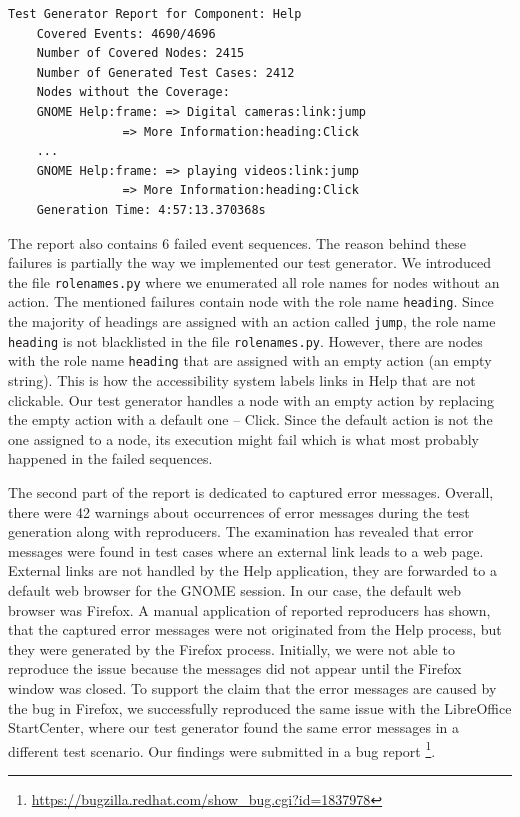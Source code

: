\begin{minipage}\linewidth
\begin{lstlisting}[caption={
Final test generator report for GNOME Help},label={yelp-report}]
    Test Generator Report for Component: Help
    Covered Events: 4690/4696
    Number of Covered Nodes: 2415
    Number of Generated Test Cases: 2412
    Nodes without the Coverage:
    GNOME Help:frame: => Digital cameras:link:jump 
                => More Information:heading:Click
    ...
    GNOME Help:frame: => playing videos:link:jump
                => More Information:heading:Click 
    Generation Time: 4:57:13.370368s
\end{lstlisting}
\end{minipage}

The report also contains 6 failed event sequences. The reason behind these failures is partially the way we implemented our test generator. We introduced the file \texttt{rolenames.py} where we enumerated all role names for nodes without an action. The mentioned failures contain node with the role name \texttt{heading}. Since the majority of headings are assigned with an action called \texttt{jump}, the role name \texttt{heading} is not blacklisted in the file \texttt{rolenames.py}. However, there are nodes with the role name \texttt{heading} that are assigned with an empty action (an empty string). This is how the accessibility system labels links in Help that are not clickable. Our test generator handles a node with an empty action by replacing the empty action with a default one -- Click. Since the default action is not the one assigned to a node, its execution might fail which is what most probably happened in the failed sequences. 

The second part of the report is dedicated to captured error messages. Overall, there were 42 warnings about occurrences of error messages during the test generation along with reproducers. The examination has revealed that error messages were found in test cases where an external link leads to a web page. External links are not handled by the Help application, they are forwarded to a default web browser for the GNOME session. In our case, the default web browser was Firefox. A manual application of reported reproducers has shown, that the captured error messages were not originated from the Help process, but they were generated by the Firefox process. Initially, we were not able to reproduce the issue because the messages did not appear until the Firefox window was closed. To support the claim that the error messages are caused by the bug in Firefox, we successfully reproduced the same issue with the LibreOffice StartCenter, where our test generator found the same error messages in a different test scenario. Our findings were submitted in a bug report \footnote{\url{https://bugzilla.redhat.com/show_bug.cgi?id=1837978}}. 

